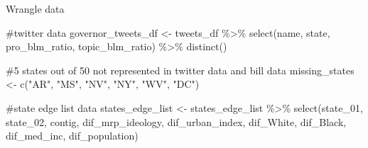 \documentclass[
  letterpaper,
  DIV=11,
  numbers=noendperiod]{scrartcl}
\newenvironment{Shaded}{\begin{snugshade}}{\end{snugshade}}
\newcommand{\CommentTok}[1]{\textcolor[rgb]{0.37,0.37,0.37}{#1}}
\newcommand{\FunctionTok}[1]{\textcolor[rgb]{0.28,0.35,0.67}{#1}}
\newcommand{\NormalTok}[1]{\textcolor[rgb]{0.00,0.23,0.31}{#1}}
\newcommand{\OtherTok}[1]{\textcolor[rgb]{0.00,0.23,0.31}{#1}}
\newcommand{\SpecialCharTok}[1]{\textcolor[rgb]{0.37,0.37,0.37}{#1}}
\newcommand{\StringTok}[1]{\textcolor[rgb]{0.13,0.47,0.30}{#1}}
\begin{document}
Wrangle data

\begin{Shaded}
\begin{Highlighting}[]
\CommentTok{\#twitter data}
\NormalTok{governor\_tweets\_df }\OtherTok{\textless{}{-}}\NormalTok{ tweets\_df }\SpecialCharTok{\%\textgreater{}\%} 
  \FunctionTok{select}\NormalTok{(name, state, }
\NormalTok{         pro\_blm\_ratio, topic\_blm\_ratio) }\SpecialCharTok{\%\textgreater{}\%} 
  \FunctionTok{distinct}\NormalTok{() }

\CommentTok{\#5 states out of 50 not represented in twitter data and bill data}
\NormalTok{missing\_states }\OtherTok{\textless{}{-}} \FunctionTok{c}\NormalTok{(}\StringTok{"AR"}\NormalTok{, }\StringTok{"MS"}\NormalTok{, }\StringTok{"NV"}\NormalTok{, }\StringTok{"NY"}\NormalTok{, }\StringTok{"WV"}\NormalTok{, }\StringTok{"DC"}\NormalTok{)}

\CommentTok{\#state edge list data}
\NormalTok{states\_edge\_list }\OtherTok{\textless{}{-}}\NormalTok{ states\_edge\_list }\SpecialCharTok{\%\textgreater{}\%} 
  \FunctionTok{select}\NormalTok{(state\_01, state\_02, contig, dif\_mrp\_ideology, dif\_urban\_index, }
\NormalTok{         dif\_White, dif\_Black, }
\NormalTok{         dif\_med\_inc,}
\NormalTok{         dif\_population)}


\end{Highlighting}
\end{Shaded}
\end{document}
